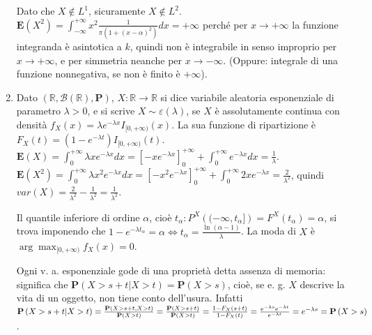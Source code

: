 \documentclass{article}
\begin{document}
\begin{enumerate}
Dato che $X\not\in L^{1}$, sicuramente $X\not\in L^{2}$. $\mathbf{E}\left(
X^{2}\right) =\int_{-\infty }^{+\infty }x^{2}\frac{1}{\pi \left( 1+\left(
x-\alpha \right) ^{2}\right) }dx=+\infty $ perch\'{e} per $x\rightarrow
+\infty $ la funzione integranda \`{e} asintotica a $k$, quindi non \`{e}
integrabile in senso improprio per $x\rightarrow +\infty $, e per simmetria
neanche per $x\rightarrow -\infty $. (Oppure: integrale di una funzione
nonnegativa, se non \`{e} finito \`{e} $+\infty $).

\item Dato $\left( 
\mathbb{R}
,\mathcal{B}\left( 
\mathbb{R}
\right) ,\mathbf{P}\right) $, $X:%
\mathbb{R}
\rightarrow 
\mathbb{R}
$ si dice variabile aleatoria esponenziale di parametro $\lambda >0$, e si
scrive $X\sim \varepsilon \left( \lambda \right) $, se $X$ \`{e}
assolutamente continua con densit\`{a} $f_{X}\left( x\right) =\lambda
e^{-\lambda x}I_{[0,+\infty )}\left( x\right) $. La sua funzione di
ripartizione \`{e} $F_{X}\left( t\right) =\left( 1-e^{-\lambda t}\right)
I_{[0,+\infty )}\left( t\right) $. $\mathbf{E}\left( X\right)
=\int_{0}^{+\infty }\lambda xe^{-\lambda x}dx=\allowbreak \left[
-xe^{-\lambda x}\right] _{0}^{+\infty }+\int_{0}^{+\infty }e^{-\lambda x}dx=%
\frac{1}{\lambda }$. $\mathbf{E}\left( X^{2}\right) =\int_{0}^{+\infty
}\lambda x^{2}e^{-\lambda x}dx=\left[ -x^{2}e^{-\lambda x}\right]
_{0}^{+\infty }+\int_{0}^{+\infty }2xe^{-\lambda x}=\frac{2}{\lambda ^{2}}$,
quindi $var\left( X\right) =\frac{2}{\lambda ^{2}}-\frac{1}{\lambda ^{2}}=%
\frac{1}{\lambda ^{2}}$.

Il quantile inferiore di ordine $\alpha $, cio\`{e} $t_{\alpha }:P^{X}\left(
(-\infty ,t_{\alpha }]\right) =F^{X}\left( t_{\alpha }\right) =\alpha $, si
trova imponendo che $1-e^{-\lambda t_{\alpha }}=\alpha \Longleftrightarrow
t_{\alpha }=\frac{\ln \left( \alpha -1\right) }{\lambda }$. La moda di $X$ 
\`{e} $\arg \max_{[0,+\infty )}f_{X}\left( x\right) =0$.

Ogni v. a. esponenziale gode di una propriet\`{a} detta assenza di memoria:
significa che $\mathbf{P}\left( X>s+t|X>t\right) =\mathbf{P}\left(
X>s\right) $, cio\`{e}, se e. g. $X$ descrive la vita di un oggetto, non
tiene conto dell'usura. Infatti $\mathbf{P}\left( X>s+t|X>t\right) =\frac{%
\mathbf{P}\left( X>s+t,X>t\right) }{\mathbf{P}\left( X>t\right) }=\frac{%
\mathbf{P}\left( X>s+t\right) }{\mathbf{P}\left( X>t\right) }=\frac{%
1-F_{X}\left( s+t\right) }{1-F_{X}\left( t\right) }=\frac{e^{-\lambda
s}e^{-\lambda t}}{e^{-\lambda t}}=e^{-\lambda s}=\mathbf{P}\left( X>s\right) 
$.


\end{enumerate}
\end{document}
